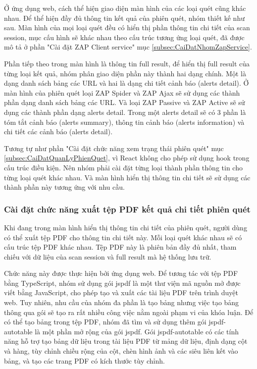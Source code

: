 Ở ứng dụng web, cách thể hiện giao diện màn hình của các loại quét cũng khác nhau.
Để thể hiện đầy đủ thông tin kết quả của phiên quét, nhóm thiết kế như sau.
Màn hình của mọi loại quét đều có hiển thị phần thông tin chi tiết của scan session, mục cấu hình sẽ khác nhau theo cấu trúc tương ứng loại quét, đã được mô tả ở phần "Cài đặt ZAP Client service" mục \ref{subsec:CaiDatNhomZapService}.

Phần tiếp theo trong màn hình là thông tin full result, để hiển thị full result của từng loại kết quả, nhóm phân giao diện phần này thành hai dạng chính. Một là dạng danh sách bảng các URL và hai là dạng chi tiết cảnh báo (alerts detail). Ở màn hình của phiên quét loại ZAP Spider và ZAP Ajax sẽ sử dụng các thành phần dạng danh sách bảng các URL. Và loại ZAP Passive và ZAP Active sẽ sử dụng các thành phần dạng alerts detail. Trong một alerts detail sẽ có 3 phần là tóm tắt cảnh báo (alerts summary), thông tin cảnh báo (alerts information) và chi tiết các cảnh báo (alerts detail).

Tương tự như phần "Cài đặt chức năng xem trạng thái phiên quét" mục \ref{subsec:CaiDatQuanLyPhienQuet}, vì React không cho phép sử dụng hook trong cấu trúc điều kiện. Nên nhóm phải cài đặt từng loại thành phần thông tin cho từng loại quét khác nhau. Và màn hình hiển thị thông tin chi tiết sẽ sử dụng các thành phần này tương ứng với nhu cầu.

\subsubsection{Cài đặt chức năng xuất tệp PDF kết quả chi tiết phiên quét}

\tab Khi đang trong màn hình hiển thị thông tin chi tiết của phiên quét, người dùng có thể xuất tệp PDF cho thông tin chi tiết này. Mỗi loại quét khác nhau sẽ có cấu trúc tệp PDF khác nhau. Tệp PDF này là phiên bản đầy đủ nhất, tham chiếu với dữ liệu của scan session và full result mà hệ thống lưu trữ.

Chức năng này được thực hiện bởi ứng dụng web. Để tương tác với tệp PDF bằng TypeScript, nhóm sử dụng gói jspdf là một thư viện mã nguồn mở được viết bằng JavaScript, cho phép tạo và xuất các tài liệu PDF trên trình duyệt web. Tuy nhiên, nhu cầu của nhóm đa phần là tạo bảng nhưng việc tạo bảng thông qua gói sẽ tạo ra rất nhiều công việc nằm ngoài phạm vi của khóa luận. Để có thể tạo bảng trong tệp PDF, nhóm đã tìm và sử dụng thêm gói jspdf-autotable là một phần mở rộng của gói jspdf. Gói jspdf-autotable có các tính năng hỗ trợ tạo bảng dữ liệu trong tài liệu PDF từ mảng dữ liệu, định dạng cột và hàng, tùy chỉnh chiều rộng của cột, chèn hình ảnh và các siêu liên kết vào bảng, và tạo các trang PDF có kích thước tùy chỉnh.


